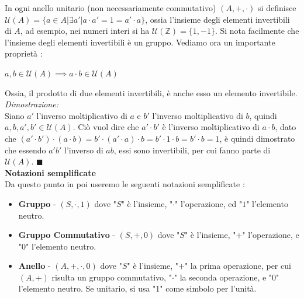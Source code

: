\documentclass[12pt, letterpaper]{article}
\begin{document}
In ogni anello unitario (non necessariamente commutativo) \((A,+,\cdot)\) si definisce \(\mathcal{U}(A)=\{a\in A |
\exists a' | a\cdot a' = 1  = a'\cdot a\}\), ossia l'insieme degli elementi invertibili di \(A\), ad esempio, nei 
numeri interi si ha \(\mathcal{U}(\mathbb{Z})=\{1,-1\}\). Si nota facilmente che l'insieme degli elementi invertibili 
è un gruppo. Vediamo ora un importante proprietà : \begin{center}
    \(a,b \in \mathcal{U}(A)\implies a\cdot b \in \mathcal{U}(A)\)
\end{center}
Ossia, il prodotto di due elementi invertibili, è anche esso un elemento invertibile.\\\textit{Dimostrazione:}\\
Siano \(a'\) l'inverso moltiplicativo di \(a\) e \(b'\) l'inverso moltiplicativo di \(b\), quindi \(a,b,a',b'\in \mathcal{U}(A)\).
Ciò vuol dire che \(a'\cdot b'\) è l'inverso moltiplicativo di \(a\cdot b\), dato che \((a'\cdot b')\cdot (a\cdot b) 
= b'\cdot(a'\cdot a)\cdot b=b'\cdot1\cdot b=b'\cdot b=1\), è quindi dimostrato che essendo \(a'b'\) l'inverso di 
\(ab\), essi sono invertibili, per cui fanno parte di \(\mathcal{U}(A)\). \(\blacksquare\)
\\\large\textbf{Notazioni semplificate}\\
\normalsize Da questo punto in poi useremo le seguenti notazioni semplificate : \begin{itemize}
    \item \textbf{Gruppo} - \((S,\cdot,1)\) dove "\(S\)" è l'insieme, "\(\cdot\)" 
    l'operazione, ed "\(1\)" l'elemento neutro.
    \item \textbf{Gruppo Commutativo} - \((S,+,0)\) dove "\(S\)" è l'insieme, "\(+\)" 
    l'operazione, e "\(0\)" l'elemento neutro.
    \item \textbf{Anello} - \((A,+,\cdot,0)\) dove "\(S\)" è l'insieme, "\(+\)" 
    la prima operazione, per cui \((A,+)\) risulta un gruppo commutativo,
    "\(\cdot\)" la seconda operazione, e "\(0\)" l'elemento neutro. Se unitario, si usa "1" come simbolo per l'unità.
\end{itemize}
\end{document}
